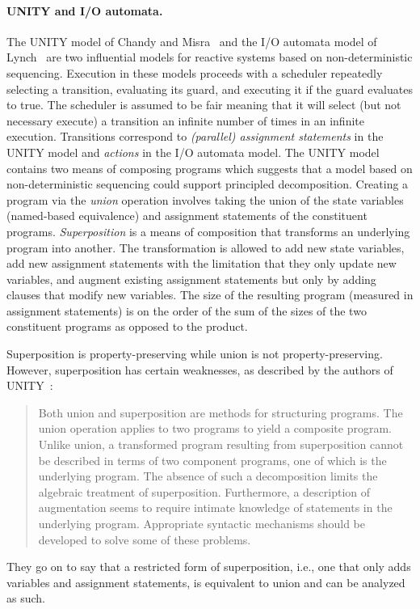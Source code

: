 \paragraph{UNITY and I/O automata.}
The UNITY model of Chandy and Misra~\cite{chandy1989parallel} and the I/O automata model of Lynch~\cite{nancy1996distributed} are two influential models for reactive systems based on non-deterministic sequencing.
Execution in these models proceeds with a scheduler repeatedly selecting a transition, evaluating its guard, and executing it if the guard evaluates to true.
The scheduler is assumed to be fair meaning that it will select (but not necessary execute) a transition an infinite number of times in an infinite execution.
Transitions correspond to \emph{(parallel) assignment statements} in the UNITY model and \emph{actions} in the I/O automata model.
The UNITY model contains two means of composing programs which suggests that a model based on non-deterministic sequencing could support principled decomposition.
Creating a program via the \emph{union} operation involves taking the union of the state variables (named-based equivalence) and assignment statements of the constituent programs.
\emph{Superposition} is a means of composition that transforms an underlying program into another.
The transformation is allowed to add new state variables, add new assignment statements with the limitation that they only update new variables, and augment existing assignment statements but only by adding clauses that modify new variables.
The size of the resulting program (measured in assignment statements) is on the order of the sum of the sizes of the two constituent programs as opposed to the product.

Superposition is property-preserving while union is not property-preserving.
However, superposition has certain weaknesses, as described by the authors of UNITY~\cite{chandy1989parallel}:
\begin{quotation}
Both union and superposition are methods for structuring programs.
The union operation applies to two programs to yield a composite program.
Unlike union, a transformed program resulting from superposition cannot be described in terms of two component programs, one of which is the underlying program.
The absence of such a decomposition limits the algebraic treatment of superposition.
Furthermore, a description of augmentation seems to require intimate knowledge of statements in the underlying program.
Appropriate syntactic mechanisms should be developed to solve some of these problems.
\end{quotation}
They go on to say that a restricted form of superposition, i.e., one that only adds variables and assignment statements, is equivalent to union and can be analyzed as such.

